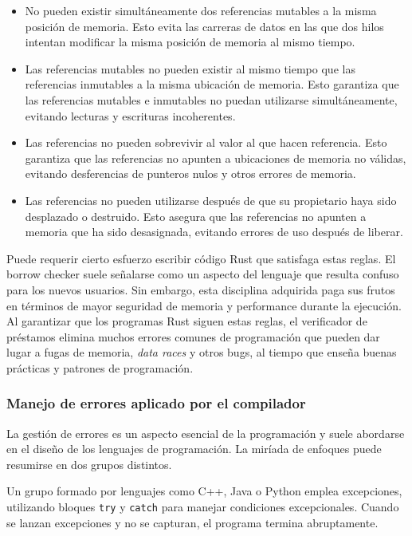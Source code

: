 \begin{itemize}
      \item No pueden existir simultáneamente dos referencias mutables a la misma posición de
            memoria. Esto evita las carreras de datos en las que dos hilos intentan modificar la
            misma posición de memoria al mismo tiempo.
      \item Las referencias mutables no pueden existir al mismo tiempo que las referencias
            inmutables a la misma ubicación de memoria. Esto garantiza que las referencias mutables
            e inmutables no puedan utilizarse simultáneamente, evitando lecturas y escrituras
            incoherentes.
      \item Las referencias no pueden sobrevivir al valor al que hacen referencia. Esto garantiza que
            las referencias no apunten a ubicaciones de memoria no válidas, evitando desferencias de
            punteros nulos y otros errores de memoria.
      \item Las referencias no pueden utilizarse después de que su propietario haya sido desplazado o
            destruido. Esto asegura que las referencias no apunten a memoria que ha sido
            desasignada, evitando errores de uso después de liberar.
\end{itemize}

Puede requerir cierto esfuerzo escribir código Rust que satisfaga estas reglas.
El borrow checker suele señalarse como un aspecto del lenguaje que resulta confuso para los nuevos usuarios.
Sin embargo, esta disciplina adquirida paga sus frutos en términos de mayor seguridad de memoria y
performance durante la ejecución.
Al garantizar que los programas Rust siguen estas reglas, el verificador de
préstamos elimina muchos errores comunes de programación que pueden dar lugar a fugas de
memoria, \textit{data races} y otros bugs, al tiempo que enseña buenas prácticas y patrones de
programación.

\subsubsection{Manejo de errores aplicado por el compilador}

La gestión de errores es un aspecto esencial de la programación y suele abordarse en el diseño
de los lenguajes de programación. La miríada de enfoques puede resumirse en dos grupos
distintos.

Un grupo formado por lenguajes como C++, Java o Python emplea excepciones, utilizando
bloques \texttt{try} y \texttt{catch} para manejar condiciones excepcionales. Cuando se lanzan
excepciones y no se capturan, el programa termina abruptamente.

